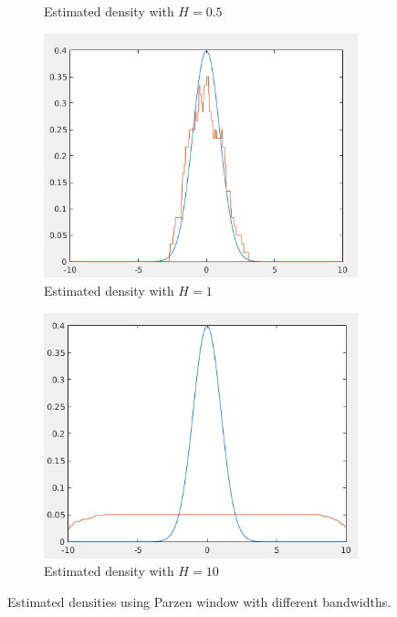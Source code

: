 \documentclass[12pt]{article}
\begin{document}
\begin{itemize}
\begin{figure}[h]
\begin{subfigure}{0.45\textwidth}
\caption{Estimated density with $H = 0.5$}
\end{subfigure}
\begin{subfigure}{0.45\textwidth}
\centering
\includegraphics[scale=0.35]{Imgs/5-6.png}
\caption{Estimated density with $H = 1$}
\end{subfigure}
\begin{subfigure}{0.45\textwidth}
\centering
\includegraphics[scale=0.35]{Imgs/5-7.png}
\caption{Estimated density with $H = 10$}
\end{subfigure}
\caption{Estimated densities using Parzen window with different bandwidths.}
\label{fig:5-4}
\end{figure}


\end{itemize}
\end{document}
